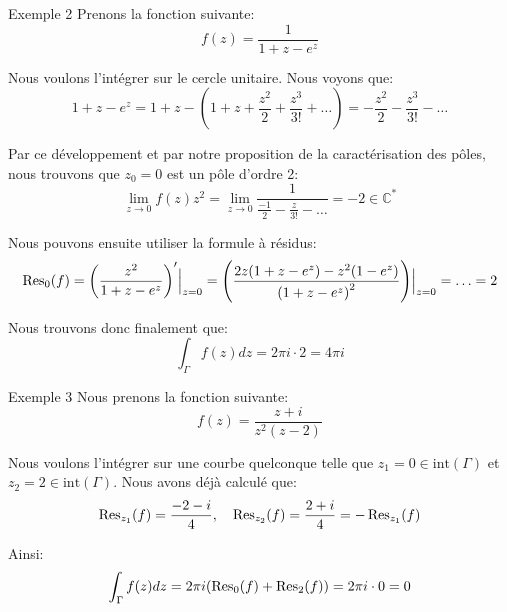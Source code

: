 \documentclass[a4paper]{article}
\begin{document}
\begin{parag}{Exemple 2}
    Prenons la fonction suivante: 
    \[f\left(z\right) = \frac{1}{1 + z - e^{z}}\]
    
    Nous voulons l'intégrer sur le cercle unitaire. Nous voyons que: 
    \[1 + z - e^z = 1 + z - \left(1 + z + \frac{z^2}{2} + \frac{z^3}{3!} + \ldots\right) = -\frac{z^2}{2} - \frac{z^3}{3!} - \ldots\]

    Par ce développement et par notre proposition de la caractérisation des pôles, nous trouvons que $z_0 = 0$ est un pôle d'ordre 2: 
    \[\lim_{z \to 0} f\left(z\right) z^2 = \lim_{z \to 0} \frac{1}{\frac{-1}{2} - \frac{z}{3!} - \ldots} = -2 \in \mathbb{C}^*\]

    Nous pouvons ensuite utiliser la formule à résidus: 
    \[\Res_0\left(f\right) = \left(\frac{z^2}{1 + z - e^z}\right)' \eval_{z=0}^{} = \left(\frac{2z\left(1 + z - e^z\right) - z^2 \left(1 - e^z\right)}{\left(1 + z - e^z\right)^2}\right) \eval_{z=0}^{} = \ldots = 2\]
    
    Nous trouvons donc finalement que: 
    \[\int_{\Gamma} f\left(z\right)dz = 2\pi i \cdot  2 = 4\pi i\]
\end{parag}

\begin{parag}{Exemple 3}
    Nous prenons la fonction suivante: 
    \[f\left(z\right) = \frac{z + i}{z^2 \left(z- 2\right)}\]
    
    Nous voulons l'intégrer sur une courbe quelconque telle que $z_1 = 0 \in \text{int}\left(\Gamma\right)$ et $z_2 = 2 \in \text{int}\left(\Gamma\right)$. Nous avons déjà calculé que: 
    \[\Res_{z_1} \left(f\right) = \frac{-2 - i}{4}, \mathspace \Res_{z_2}\left(f\right) = \frac{2 + i}{4} = -\Res_{z_1}\left(f\right)\]
    
    Ainsi: 
    \[\int_{\Gamma} f\left(z\right)dz = 2\pi i \left(\Res_0\left(f\right) + \Res_2\left(f\right)\right) = 2\pi i \cdot  0 = 0\]
\end{parag}
\end{document}
